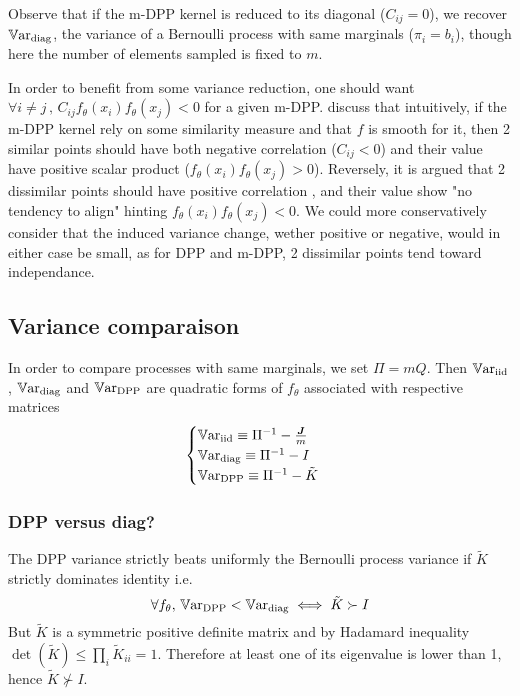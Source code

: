 Observe that if the m-DPP kernel is reduced to its diagonal ($C_{ij} = 0$), we recover $\operatorname{\mathbb V ar}_{\textrm{diag}}$, the variance of a Bernoulli process with same marginals ($\pi_i = b_i$), though here the number of elements sampled is fixed to $m$.

In order to benefit from some variance reduction, one should want $\forall i\neq j \,,\, C_{ij}f_\theta(x_i) f_\theta(x_j) <0$ for a given m-DPP.
\cite{zhang2017dppminibatch} discuss that intuitively, if the m-DPP kernel rely on some similarity measure and that $f$ is smooth for it, then 2 similar points should have both negative correlation ($C_{ij}<0$) and their value have positive scalar product ($f_\theta(x_i) f_\theta(x_j) > 0$). Reversely, it is argued that 2 dissimilar points should have positive correlation 
, and their value show "no tendency to align" hinting $f_\theta(x_i) f_\theta(x_j) < 0$. We could more conservatively consider that the induced variance change, wether positive or negative, would in either case be small, as for DPP and m-DPP, 2 dissimilar points tend toward independance.




\subsection[]{Variance comparaison}
In order to compare processes with same marginals, we set $\Pi = mQ$. Then $\operatorname{\mathbb V ar}_{\textrm{iid}}$, $\operatorname{\mathbb V ar}_{\textrm{diag}}$ and $\operatorname{\mathbb V ar}_{\textrm{DPP}}$ are quadratic forms of $f_\theta$ associated with respective matrices
$$\begin{cases}
	\operatorname{\mathbb V ar}_{\textrm{iid}} \equiv \Pi^{-1} - \frac{\boldsymbol{J}}{m} \\
	\operatorname{\mathbb V ar}_{\textrm{diag}} \equiv \Pi^{-1} - I \\
	\operatorname{\mathbb V ar}_{\textrm{DPP}} \equiv \Pi^{-1} - \tilde K
\end{cases}$$

\subsubsection{DPP versus diag?}
The DPP variance strictly beats uniformly the Bernoulli process variance if $\tilde K$ strictly dominates identity i.e. 
\begin{equation}
	\forall f_\theta, \, \operatorname{\mathbb V ar}_{\textrm{DPP}} < \operatorname{\mathbb V ar}_{\textrm{diag}} \iff \tilde K \succ I
\end{equation}
But $\tilde K$ is a symmetric positive definite matrix and by Hadamard inequality $\det( \tilde K) \leq \prod_{i} \tilde K_{ii}= 1$. Therefore at least one of its eigenvalue is lower than 1, hence $\tilde K \nsucc I$.

